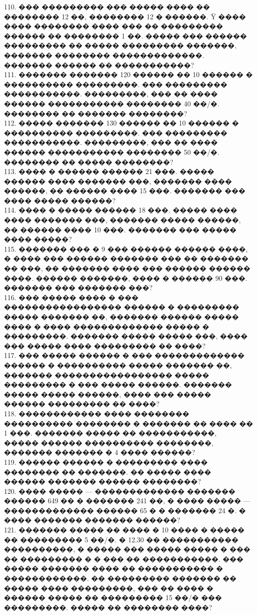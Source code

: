 \documentclass[12pt]{article}
\begin{document}
110. ��� ��������� ��� ����� ���� �� �������� 12 ��, �������� 12 � ������. Ÿ ���� ���� �������� ���� ��� �� ��������� ������ �� �������� 1 ��. ����� ��� ������ ��������� �� ����� ��������� �������, ������� �������� �������������. ������� ������ �� �����������?\\
111. ������� ������� 120 ������ �� 10 ������ � ���������� ���������. ��� ��������� �����������. ���������, ��� �� ���� ������ ����������� �������� 40 ��/�. �������� �� ������� ��������?\\
112. ����� ������� 130 ������ �� 10 ������ � ���������� ���������. ��� ��������� �����������. ���������, ��� �� ���� ������ ����������� �������� 50 ��/�. �������� �� ����� ��������?\\
113. ���� � ������ ������ 21 ���. ����� ������ ���� ������� ���, ������� ���� ������, �� ������ ���� 15 ���. ������� ��� ���� ����� ������?\\
114. ���� � ����� ������ 18 ���. ����� ���� ���� ������� ���, ������� ����� ������, �� ������ ���� 10 ���. ������� ��� ����� ���� �����?\\
115. ������� ��� � 9 ��� ������ ������ ����, � ���� ��� ������ ������� ��� �� ������� �� ���, �� ������� ���� ��� ������ ������ ����. ������ �������, ���� � ������ 90 ���. ������� ��� ������� ���?\\
116. ��� ����� ���� � ��� ����������������� ������ � ��������� ����� ������� ��, ������� ������ ����� ���� � ���� ������������� ����� � ���������. ������� ����� ����� ���, ���� ��� ����� ���� ��������� �� ����?\\
117. ��� ����� ������ � ��� ������������� ������ � ���������� ����� ������� ��, ������� ����������������� ����� ��������� � ��� ����� ������. ������� ����� ����� ������, ���� ��� ����� ������ ��������� �� ����?\\
118. ������������ ���� �������� ���������� �������� � ������� �� ���� �� 1 ���. ������� ����� �� �����������, ����� ������ ���������� ��������, ������� ������� � 4 ���� ������?\\
119. ������ ������ � ��������� ���� �������� �� �������. �� ����� ���� ������ ������� ������ ��������?\\
120. ���� ����� --- ������������� ������� ������ 649 �� � ������� 241 ��, � ���� ����� --- ������������� ������ 65 � � ������� 24 �. � ���� ������� ������� ������?\\
121. ������� ����� �� ���� � 10 ���� � ����� �� ��������� 5 ��/�. � 12.30 �� ����������� ����������, � ����� ��� ����� ����� � ��� �� ��������� � � ��� �� �����������. ��� ����� ������� ���� �� ����������� � ������������. �� ��������� ������� �� ����� ���� ���������, ��� �� ���� � ������ ����� �� ��������� 15 ��/� ��� ���������. ����� �� �������� ����?\\
\end{document}
